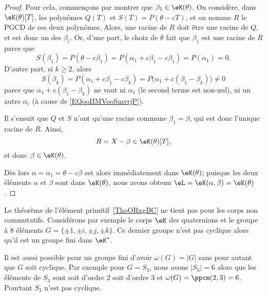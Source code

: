 \begin{proof}
	Pour cela, commençons par montrer que \( \beta_1 \in \eK(\theta)\). On considère, dans \( \eK(\theta)[T]\), les polynômes \( Q(T)\) et \( S(T)=P(\theta-cT)\), et on nomme \( R\) le PGCD de ces deux polynômes. Alors, une racine de \( R\) doit être une racine de \( Q\), et est donc un des \( \beta_i\). Or, d'une part, le choix de \( \theta\) fait que \( \beta_1\) est une racine de \( R\) parce que
	\begin{equation}
		S(\beta_1)=P(\theta-c\beta_1)=P(\alpha_1+c\beta_1-c\beta_1)=P(\alpha_1)=0.
	\end{equation}
	D'autre part, si \( k\geq 2\), alors
	\begin{equation}
		S(\beta_k)=P(\alpha_1 + c \beta_1 - c \beta_k) = P\big(\alpha_1 +c(\beta_1-\beta_k)\big)\neq 0
	\end{equation}
	parce que \( \alpha_1 +c(\beta_1 - \beta_k)\) ne vaut ni \( \alpha_1 \) (le second terme est non-nul), ni un autre \( \alpha_i\) (à cause de \eqref{EQooIIMVooSmvrjP}).

	Il s'ensuit que \( Q \) et \(S \) n'ont qu'une racine commune \( \beta_1 = \beta \), qui est donc l'unique racine de \( R\). Ainsi,
	\begin{equation}
		R=X-\beta\in \eK(\theta)[T],
	\end{equation}
	et donc \( \beta\in \eK(\theta)\).

	Dès lors \( \alpha=\alpha_1=\theta-c\beta\) est alors immédiatement dans \( \eK(\theta)\); puisque les deux éléments \( \alpha\) et \( \beta\) sont dans \( \eK(\theta)\), nous avons obtenu \( \eL=\eK(\alpha,\beta)=\eK(\theta)\).

\end{proof}

\begin{example}
	Le théorème de l'élément primitif~\ref{ThoORxgBC} ne tient pas pour les corps non commutatifs. Considérons par exemple le corps \( \eK\) des quaternions et le groupe à \( 8\) éléments \( G=\{ \pm 1,\pm i,\pm j,\pm k \}\). Ce dernier groupe n'est pas cyclique alors qu'il est un groupe fini dans \( \eK^*\).
\end{example}

\begin{example}
	Il est aussi possible pour un groupe fini d'avoir \( \omega(G)=| G |\) sans pour autant que \( G\) soit cyclique. Par exemple pour \( G=S_3\), nous avons \( | S_3 |=6\) alors que les éléments de \( S_3\) sont soit d'ordre \( 2\) soit d'ordre \( 3\) et \( \omega(G)=\ppcm(2,3)=6\). Pourtant \( S_3\) n'est pas cyclique.
\end{example}

